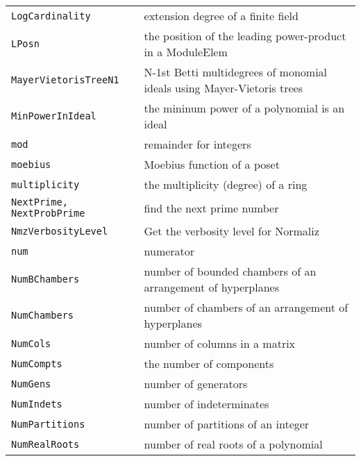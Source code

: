 \documentclass[a4paper]{mybook}
\begin{document}
\begin{center}
\begin{longtable}{ll}
{\verb~LogCardinality~} &
      extension degree of a finite field\\
   
{\verb~LPosn~} &
      the position of the leading power-product in a ModuleElem\\
   
{\verb~MayerVietorisTreeN1~} &
      N-1st Betti multidegrees of monomial ideals using Mayer-Vietoris trees\\
   
{\verb~MinPowerInIdeal~} &
      the mininum power of a polynomial is an ideal\\
   
{\verb~mod~} &
      remainder for integers\\
   
{\verb~moebius~} &
      Moebius function of a poset\\
   
{\verb~multiplicity~} &
      the multiplicity (degree) of a ring\\
   
{\verb~NextPrime, NextProbPrime~} &
      find the next prime number\\
   
{\verb~NmzVerbosityLevel~} &
      Get the verbosity level for Normaliz\\
   
{\verb~num~} &
      numerator\\
   
{\verb~NumBChambers~} &
      number of bounded chambers of an arrangement of hyperplanes\\
   
{\verb~NumChambers~} &
      number of chambers of an arrangement of hyperplanes\\
   
{\verb~NumCols~} &
      number of columns in a matrix\\
   
{\verb~NumCompts~} &
      the number of components\\
   
{\verb~NumGens~} &
      number of generators\\
   
{\verb~NumIndets~} &
      number of indeterminates\\
   
{\verb~NumPartitions~} &
      number of partitions of an integer\\
   
{\verb~NumRealRoots~} &
      number of real roots of a polynomial\\
   

\end{longtable}
\end{center}
\end{document}
